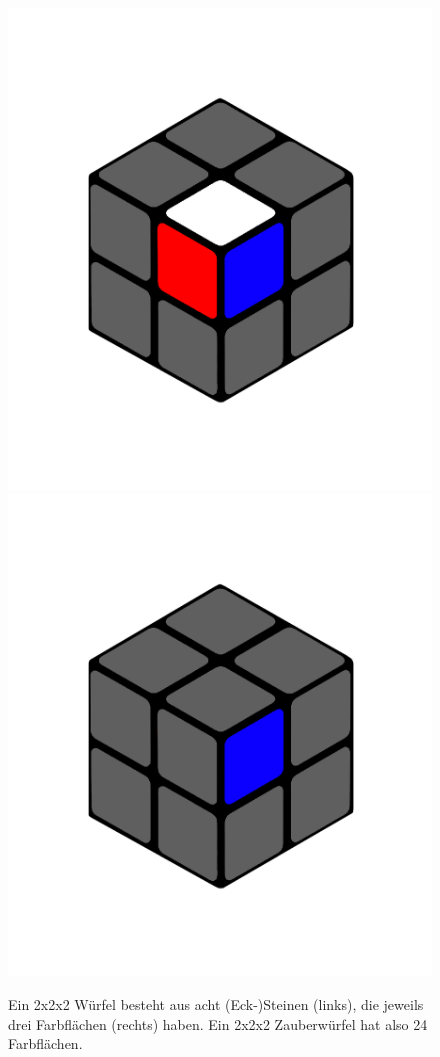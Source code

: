 \documentclass[12pt,a4paper, usenames, dvipsnames]{scrartcl}
\begin{document}
\begin{figure}[h]
\centering
\includegraphics[scale=0.1]{2x2stein.png}
\includegraphics[scale=0.1]{2x2farbflaeche.png}
\caption{Ein 2x2x2 Würfel besteht aus acht (Eck-)Steinen (links), die jeweils drei Farbflächen (rechts) haben. Ein 2x2x2 Zauberwürfel hat also 24 Farbflächen.}
\end{figure}
\end{document}
